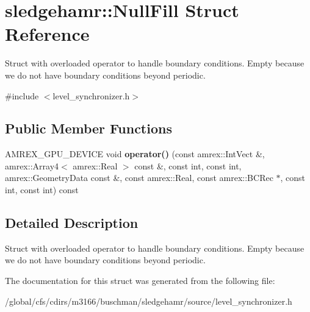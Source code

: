 \hypertarget{structsledgehamr_1_1NullFill}{}\section{sledgehamr\+:\+:Null\+Fill Struct Reference}
\label{structsledgehamr_1_1NullFill}


Struct with overloaded operator to handle boundary conditions. Empty because we do not have boundary conditions beyond periodic.  




{\ttfamily \#include $<$level\+\_\+synchronizer.\+h$>$}

\subsection*{Public Member Functions}
\begin{DoxyCompactItemize}
\item 
\mbox{\label{structsledgehamr_1_1NullFill_a8bfb3d98c7ccfe97336f9507e8f78d06}} 
A\+M\+R\+E\+X\+\_\+\+G\+P\+U\+\_\+\+D\+E\+V\+I\+CE void {\bfseries operator()} (const amrex\+::\+Int\+Vect \&, amrex\+::\+Array4$<$ amrex\+::\+Real $>$ const \&, const int, const int, amrex\+::\+Geometry\+Data const \&, const amrex\+::\+Real, const amrex\+::\+B\+C\+Rec $\ast$, const int, const int) const
\end{DoxyCompactItemize}


\subsection{Detailed Description}
Struct with overloaded operator to handle boundary conditions. Empty because we do not have boundary conditions beyond periodic. 

The documentation for this struct was generated from the following file\+:\begin{DoxyCompactItemize}
\item 
/global/cfs/cdirs/m3166/buschman/sledgehamr/source/level\+\_\+synchronizer.\+h\end{DoxyCompactItemize}

